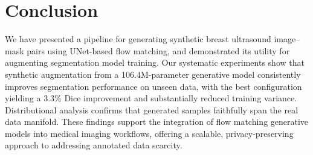 \documentclass[twocolumn]{article}
\begin{document}
\section{Conclusion}
\label{sec:conclusion}

We have presented a pipeline for generating synthetic breast ultrasound image--mask pairs using UNet-based flow matching, and demonstrated its utility for augmenting segmentation model training. Our systematic experiments show that synthetic augmentation from a 106.4M-parameter generative model consistently improves segmentation performance on unseen data, with the best configuration yielding a 3.3\% Dice improvement and substantially reduced training variance. Distributional analysis confirms that generated samples faithfully span the real data manifold. These findings support the integration of flow matching generative models into medical imaging workflows, offering a scalable, privacy-preserving approach to addressing annotated data scarcity.
\end{document}
